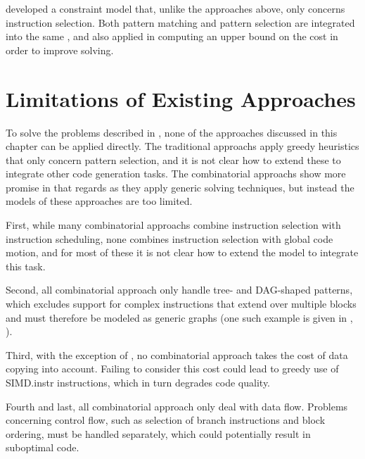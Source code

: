 \textcite{Beg:2013} developed a \gls{constraint model} that, unlike the
approaches above, only concerns \gls{instruction selection}.
%
Both \gls{pattern matching} and \gls{pattern selection} are integrated into the
same , and \citeauthor{Beg:2013} also applied
 in computing an upper bound on the cost
in order to improve solving.



\section{Limitations of Existing Approaches}

To solve the problems described in , none of the
approaches discussed in this chapter can be applied directly.
%
The \glspl{traditional approach} apply greedy heuristics that only concern
\gls{pattern selection}, and it is not clear how to extend these to integrate
other \gls{code generation} tasks.
%
The \glspl{combinatorial approach} show more promise in that regards as they
apply generic solving techniques, but instead the models of these approaches are
too limited.

First, while many \glspl{combinatorial approach} combine \gls{instruction
  selection} with \gls{instruction scheduling}, none combines \gls{instruction
  selection} with \gls{global code motion}, and for most of these it is not
clear how to extend the model to integrate this task.

Second, all \gls{combinatorial approach} only handle tree- and \gls{DAG}-shaped
\glspl{pattern}, which excludes support for complex \glspl{instruction} that
extend over multiple \glspl{block} and must therefore be modeled as generic
\glspl{graph} (one such example is given in
, ).

Third, with the exception of \textcite{TanakaEtAl:2003}, no \gls{combinatorial
  approach} takes the cost of \gls{data copying} into account.
%
Failing to consider this cost could lead to greedy use of \gls{SIMD.instr}
\glspl{instruction}, which in turn degrades code quality.

Fourth and last, all \gls{combinatorial approach} only deal with data flow.
%
Problems concerning control flow, such as selection of branch
\glspl{instruction} and \gls{block ordering}, must be handled separately, which
could potentially result in suboptimal code.
